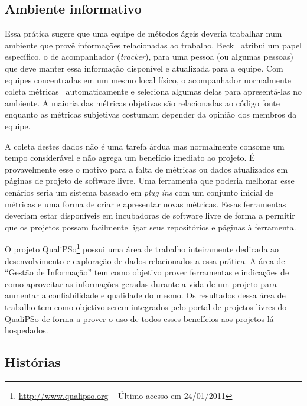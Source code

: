 \subsection{Ambiente informativo}
\label{subsec:inform-worksp}


Essa prática sugere que uma equipe de métodos ágeis deveria trabalhar
num ambiente que provê informações relacionadas ao
trabalho. Beck~\cite{XP01} atribui um papel específico, o de
acompanhador (\emph{tracker}), para uma pessoa (ou algumas pessoas)
que deve manter essa informação disponível e atualizada para a
equipe. Com equipes concentradas em um mesmo local físico, o
acompanhador normalmente coleta métricas~\cite{Sato2007}
automaticamente e seleciona algumas delas para apresentá-las no
ambiente. A maioria das métricas objetivas são relacionadas ao código
fonte enquanto as métricas subjetivas costumam depender da opinião dos
membros da equipe.

A coleta destes dados não é uma tarefa árdua mas normalmente consome
um tempo considerável e não agrega um benefício imediato ao projeto. É
provavelmente esse o motivo para a falta de métricas ou dados
atualizados em páginas de projeto de software livre. Uma ferramenta
que poderia melhorar esse cenários seria um sistema baseado em
\emph{plug ins} com um conjunto inicial de métricas e uma forma de
criar e apresentar novas métricas. Essas ferramentas deveriam estar
disponíveis em incubadoras de software livre de forma a permitir que
os projetos possam facilmente ligar seus repositórios e páginas à
ferramenta.

O projeto QualiPSo\footnote{\url{http://www.qualipso.org} -- Último
  acesso em 24/01/2011} possui uma área de trabalho inteiramente
dedicada ao desenvolvimento e exploração de dados relacionados a essa
prática. A área de ``Gestão de Informação'' tem como objetivo prover
ferramentas e indicações de como aproveitar as informações geradas
durante a vida de um projeto para aumentar a confiabilidade e
qualidade do mesmo. Os resultados dessa área de trabalho tem como
objetivo serem integrados pelo portal de projetos livres do QualiPSo
de forma a prover o uso de todos esses benefícios aos projetos lá
hospedados.

\subsection{Histórias}
\label{subsec:stories}

